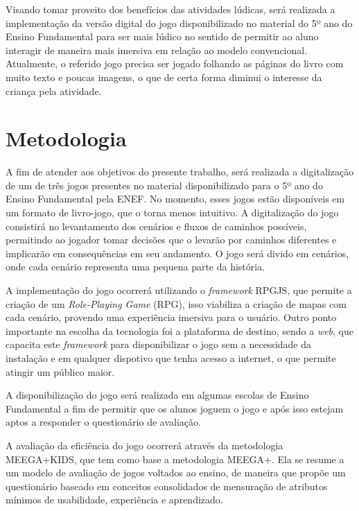     Visando tomar proveito dos benefícios das atividades lúdicas, será realizada a implementação da versão digital do
    jogo disponibilizado no material do 5º ano do Ensino Fundamental para ser mais lúdico no sentido de permitir ao
    aluno interagir de maneira mais imersiva em relação ao modelo convencional. Atualmente, o referido jogo precisa ser
    jogado folhando as páginas do livro com muito texto e poucas imagens, o que de certa forma diminui o interesse da
    criança pela atividade.

    \section{Metodologia}

        A fim de atender aos objetivos do presente trabalho, será realizada a digitalização de um de três jogos
        presentes no material disponibilizado para o 5º ano do Ensino Fundamental pela ENEF. No momento, esses jogos
        estão disponíveis em um formato de livro-jogo, que o torna menos intuitivo. A digitalização do jogo consistirá
        no levantamento dos cenários e fluxos de caminhos possíveis, permitindo ao jogador tomar decisões que o levarão
        por caminhos diferentes e implicarão em consequências em seu andamento. O jogo será divido em cenários,
        onde cada cenário representa uma pequena parte da história.

        A implementação do jogo ocorrerá utilizando o \textit{framework} RPGJS, que permite a criação de um
        \textit{Role-Playing Game} (RPG), isso viabiliza a criação de mapas com cada cenário, provendo uma experiência
        imersiva para o usuário. Outro ponto importante na escolha da tecnologia foi a plataforma de destino, sendo a
        \textit{web}, que capacita este \textit{framework} para disponibilizar o jogo sem a necessidade da instalação e
        em qualquer dispotivo que tenha acesso a internet, o que permite atingir um público maior.

        A disponibilização do jogo será realizada em algumas escolas de Ensino Fundamental a fim de permitir que os
        alunos joguem o jogo e após isso estejam aptos a responder o questionário de avaliação.

        A avaliação da eficiência do jogo ocorrerá através da metodologia MEEGA+KIDS, que tem como base a metodologia
        MEEGA+. Ela se resume a um modelo de avaliação de jogos voltados ao ensino, de maneira que propõe um
        questionário baseado em conceitos consolidados de mensuração de atributos mínimos de usabilidade, experiência e
        aprendizado.

